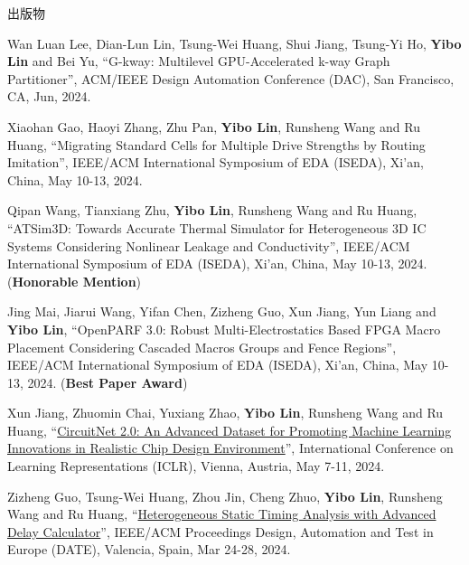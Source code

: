 \begin{rSection}{出版物}
\begin{description}[font=\normalfont, rightmargin=2em]
{}
            

\item[{[C97]}]{
        Wan Luan Lee, Dian-Lun Lin, Tsung-Wei Huang, Shui Jiang, Tsung-Yi Ho, \textbf{Yibo Lin} and Bei Yu, 
    ``G-kway: Multilevel GPU-Accelerated k-way Graph Partitioner'', 
    ACM/IEEE Design Automation Conference (DAC), San Francisco, CA, Jun, 2024.
    
}
            

\item[{[C96]}]{
        Xiaohan Gao, Haoyi Zhang, Zhu Pan, \textbf{Yibo Lin}, Runsheng Wang and Ru Huang, 
    ``Migrating Standard Cells for Multiple Drive Strengths by Routing Imitation'', 
    IEEE/ACM International Symposium of EDA (ISEDA), Xi'an, China, May 10-13, 2024.
    
}
            

\item[{[C95]}]{
        Qipan Wang, Tianxiang Zhu, \textbf{Yibo Lin}, Runsheng Wang and Ru Huang, 
    ``ATSim3D: Towards Accurate Thermal Simulator for Heterogeneous 3D IC Systems Considering Nonlinear Leakage and Conductivity'', 
    IEEE/ACM International Symposium of EDA (ISEDA), Xi'an, China, May 10-13, 2024.
    (\textbf{Honorable Mention})
}
            

\item[{[C94]}]{
        Jing Mai, Jiarui Wang, Yifan Chen, Zizheng Guo, Xun Jiang, Yun Liang and \textbf{Yibo Lin}, 
    ``OpenPARF 3.0: Robust Multi-Electrostatics Based FPGA Macro Placement Considering Cascaded Macros Groups and Fence Regions'', 
    IEEE/ACM International Symposium of EDA (ISEDA), Xi'an, China, May 10-13, 2024.
    (\textbf{Best Paper Award})
}
            

\item[{[C93]}]{
        Xun Jiang, Zhuomin Chai, Yuxiang Zhao, \textbf{Yibo Lin}, Runsheng Wang and Ru Huang, 
    ``\href{https://openreview.net/pdf?id=nMFSUjxMIl}{CircuitNet 2.0: An Advanced Dataset for Promoting Machine Learning Innovations in Realistic Chip Design Environment}'', 
    International Conference on Learning Representations (ICLR), Vienna, Austria, May 7-11, 2024.
    
}
            

\item[{[C92]}]{
        Zizheng Guo, Tsung-Wei Huang, Zhou Jin, Cheng Zhuo, \textbf{Yibo Lin}, Runsheng Wang and Ru Huang, 
    ``\href{https://ieeexplore.ieee.org/document/10546507}{Heterogeneous Static Timing Analysis with Advanced Delay Calculator}'', 
    IEEE/ACM Proceedings Design, Automation and Test in Europe (DATE), Valencia, Spain, Mar 24-28, 2024.
    
}
\end{description}
\end{rSection}
